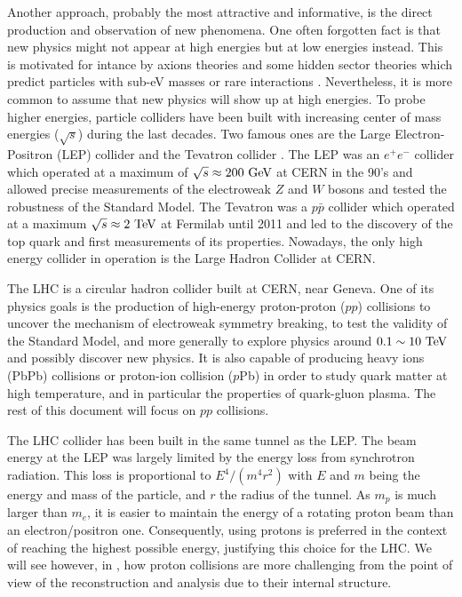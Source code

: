     Another approach, probably the most attractive and informative, is the direct production and observation of
    new phenomena. One often forgotten fact is that new physics might not appear at high
    energies but at low energies instead. This is motivated for intance by axions
    theories and some hidden sector theories which predict particles with sub-eV masses
    or rare interactions \cite{PolarizedHelium, CavityForHiddenPhotons}. Nevertheless, it
    is more common to assume that new physics will show up at high energies. To probe
    higher energies, particle colliders have been
    built with increasing center of mass energies ($\sqrt{s}$) during the last decades.
    Two famous ones are the Large Electron-Positron (LEP) collider \cite{LEP} and the
    Tevatron collider \cite{Tevatron}. The
    LEP was an $e^+e^-$ collider which operated at a maximum of $\sqrt{s} \approx 200~\text{GeV}$
    at CERN in the 90's and allowed precise measurements of the electroweak $Z$ and $W$
    bosons and tested the robustness of the Standard Model. The Tevatron was a $p\bar{p}$
    collider which operated at a maximum $\sqrt{s} \approx 2~\text{TeV}$ at Fermilab until 2011
    and led to the discovery of the top quark and first measurements of its properties.
    Nowadays, the only high energy collider in operation is the Large Hadron Collider
    at CERN.

    The LHC \cite{LHC} is a circular hadron collider built at CERN, near Geneva. One of its physics
    goals is the production of high-energy proton-proton ($pp$) collisions to uncover the mechanism
    of electroweak symmetry breaking, to test the validity of the Standard Model, and more
    generally to explore physics around $0.1 \sim 10~\text{TeV}$ and possibly discover new
    physics. It is also capable of producing heavy ions (PbPb) collisions or proton-ion
    collision ($p$Pb) in order to study quark matter at high temperature,
    and in particular the properties of quark-gluon plasma. The rest of this document will
    focus on $pp$ collisions.

    The LHC collider has been built in the same tunnel as the LEP. The beam energy at
    the LEP was largely limited by the energy loss from synchrotron radiation. This loss
    is proportional to $E^4 / (m^{4} r^{2})$ with $E$ and $m$ being the energy and mass of the
    particle, and $r$ the radius of the tunnel. As $m_p$ is much larger than $m_e$, it is
    easier to maintain the energy of a rotating proton beam than an electron/positron one.
    Consequently, using protons is preferred in the context of reaching the highest possible
    energy, justifying this choice for the LHC. We will see however, in
    , how proton collisions are more challenging
    from the point of view of the reconstruction and analysis due to their internal structure.

